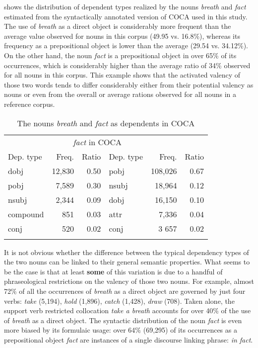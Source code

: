 \documentclass[output=paper]{langscibook}
\begin{document}
 shows the distribution of dependent types realized by the nouns \textit{breath} and \textit{fact} estimated from the syntactically annotated version of COCA used in this study. The use of \textit{breath} as a direct object is considerably more frequent than the average value observed for nouns in this corpus (49.95 vs. 16.8\%), whereas its frequency as a prepositional object is lower than the average (29.54 vs. 34.12\%). On the other hand, the noun \textit{fact} is a prepositional object in over 65\% of its occurrences, which is considerably higher than the average ratio of 34\% observed for all nouns in this corpus. This example shows that the activated valency of those two words tends to differ considerably either from their potential valency as nouns or even from the overall or average rations observed for all nouns in a reference corpus.


\begin{table}[t]
\begin{tabular}{lrr lrr}
\lsptoprule
\multicolumn{3}{c}{\textit{breath} {in} {COCA}} & \multicolumn{3}{c}{\textit{fact} {in} {COCA}}\\
\cmidrule(lr){1-3}\cmidrule(lr){4-6}
Dep. type & {Freq.} & {Ratio} & {Dep.} {type} & {Freq.} & {Ratio}\\\midrule
dobj &  12,830 &  0.50 & pobj &  108,026 &  0.67\\
pobj &  7,589 &  0.30 & nsubj &  18,964 &  0.12\\
nsubj &  2,344 &  0.09 & dobj &  16,150 &  0.10\\
compound &  851 &  0.03 & attr &  7,336 &  0.04\\
conj &  520 &  0.02 & conj &  3 657 &  0.02\\
\lspbottomrule
\end{tabular}
\caption{\label{tab:pezik:6} The nouns \textit{breath} and \textit{fact} as dependents in COCA}
\end{table}

It is not obvious whether the difference between the typical dependency types of the two nouns can be linked to their general semantic properties. What seems to be the case is that at least \textbf{some} of this variation is due to a handful of phraseological restrictions on the valency of those two nouns. For example, almost 72\% of all the occurrences of \textit{breath} as a direct object are governed by just four verbs: \textit{take} (5,194), \textit{hold} (1,896), \textit{catch} (1,428), \textit{draw} (708). Taken alone, the support verb restricted collocation \textit{take a breath} accounts for over 40\% of the use of \textit{breath} as a direct object. The syntactic distribution of the noun \textit{fact} is even more biased by its formulaic usage: over 64\% (69,295) of its occurrences as a prepositional object  \textit{fact} are instances of a single discourse linking phrase: \textit{in fact}. 
\end{document}
